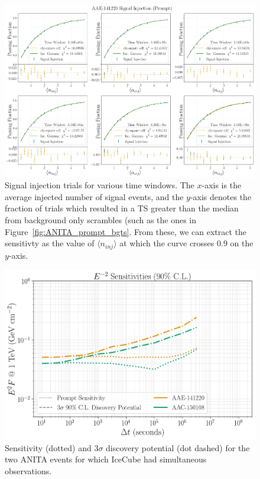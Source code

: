 \begin{figure}
    \centering
    \includegraphics[width=.95\linewidth]{figures/ANITA/Prompt/AAE-141220_prompt_sensitivity_fits.png}
    \caption[ANITA Prompt signal injection]{Signal injection trials for various time windows. The $x$-axis is the average injected number of signal events, and the $y$-axis denotes the fraction of trials which resulted in a TS greater than the median from background only scrambles (such as the ones in Figure~\ref{fig:ANITA_prompt_bgts}. From these, we can extract the sensitivty as the value of $\langle n_{inj} \rangle$ at which the curve crosses 0.9 on the $y$-axis.}
    \label{fig:ANITA_prompt_sensitivity_fits}
\end{figure}

\begin{figure}
    \centering
    \includegraphics[width=.8\linewidth]{figures/ANITA/Prompt/prompt_sensitivities_no_upper_limits.png}
    \caption[ANITA Prompt sensitivity]{Sensitivity (dotted) and 3$\sigma$ discovery potential (dot dashed) for the two ANITA events for which IceCube had simultaneous observations.}
    \label{fig:ANITA_prompt_sensitivity}
\end{figure}

